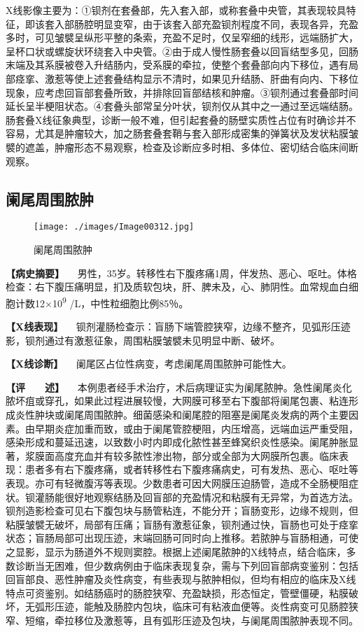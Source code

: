 X线影像主要为：①钡剂在套叠部，先入套入部，或称套叠中央管，其表现较具特征，即该套入部肠腔明显变窄，由于该套入部充盈钡剂程度不同，表现各异，充盈多时，可见皱襞呈纵形平整的条索，充盈不足时，仅呈窄细的线形，远端肠扩大，呈杯口状或螺旋状环绕套入中央管。②由于成人慢性肠套叠以回盲结型多见，回肠末端及其系膜被卷入升结肠内，受系膜的牵拉，使整个套叠部向内下移位，遇有局部痉挛、激惹等使上述套叠结构显示不清时，如果见升结肠、肝曲有向内、下移位现象，应考虑回盲部套叠所致，并排除回盲部结核和肿瘤。③钡剂通过套叠部时间延长呈半梗阻状态。④套叠头部常呈分叶状，钡剂仅从其中之一通过至远端结肠。肠套叠X线征象典型，诊断一般不难，但引起套叠的肠壁实质性占位有时确诊并不容易，尤其是肿瘤较大，加之肠套叠套鞘与套入部形成密集的弹簧状及发状粘膜皱襞的遮盖，肿瘤形态不易观察，检查及诊断应多时相、多体位、密切结合临床间断观察。

\subsection{阑尾周围脓肿}

\begin{figure}[!htbp]
 \centering
 \texttt{[image: ./images/Image00312.jpg]}
 \captionsetup{justification=centering}
 \caption{阑尾周围脓肿}
 \label{fig5-6-6}
  \end{figure} 

\textbf{【病史摘要】}
　男性，35岁。转移性右下腹疼痛1周，伴发热、恶心、呕吐。体格检查：右下腹压痛明显，扪及质软包块，肝、脾未及，心、肺阴性。血常规血白细胞计数12×10\textsuperscript{9}
/L，中性粒细胞比例85％。

\textbf{【X线表现】}
　钡剂灌肠检查示：盲肠下端管腔狭窄，边缘不整齐，见弧形压迹影，钡剂通过有激惹征象，周围粘膜皱襞未见明显中断、破坏。

\textbf{【X线诊断】} 　阑尾区占位性病变，考虑阑尾周围脓肿可能性大。

\textbf{【评　　述】}
　本例患者经手术治疗，术后病理证实为阑尾脓肿。急性阑尾炎化脓坏疽或穿孔，如果此过程进展较慢，大网膜可移至右下腹部将阑尾包裹、粘连形成炎性肿块或阑尾周围脓肿。细菌感染和阑尾腔的阻塞是阑尾炎发病的两个主要因素。由早期炎症加重而致，或由于阑尾管腔梗阻，内压增高，远端血运严重受阻，感染形成和蔓延迅速，以致数小时内即成化脓性甚至蜂窝织炎性感染。阑尾肿胀显著，浆膜面高度充血并有较多脓性渗出物，部分或全部为大网膜所包裹。临床表现：患者多有右下腹疼痛，或者转移性右下腹疼痛病史，可有发热、恶心、呕吐等表现。亦可有轻微腹泻等表现。少数患者可因大网膜压迫肠管，造成不全肠梗阻症状。钡灌肠能很好地观察结肠及回盲部的充盈情况和粘膜有无异常，为首选方法。钡剂造影检查可见右下腹包块与肠管粘连，不能分开；盲肠变形，边缘不规则，但粘膜皱襞无破坏，局部有压痛；盲肠有激惹征象，钡剂通过快，盲肠也可处于痉挛状态；盲肠局部可出现压迹，末端回肠可同时向上推移。若脓肿与盲肠相通，可使之显影，显示为肠道外不规则窦腔。根据上述阑尾脓肿的X线特点，结合临床，多数诊断当无困难，但少数病例由于临床表现复杂，需与下列回盲部病变鉴别：包括回盲部良、恶性肿瘤及炎性病变，有些表现与脓肿相似，但均有相应的临床及X线特点可资鉴别。如结肠癌时的肠腔狭窄、充盈缺损，形态恒定，管壁僵硬，粘膜破坏，无弧形压迹，能触及肠腔内包块，临床可有粘液血便等。炎性病变可见肠腔狭窄、短缩，牵拉移位及激惹等，且有弧形压迹及包块，与阑尾周围脓肿表现不同。

